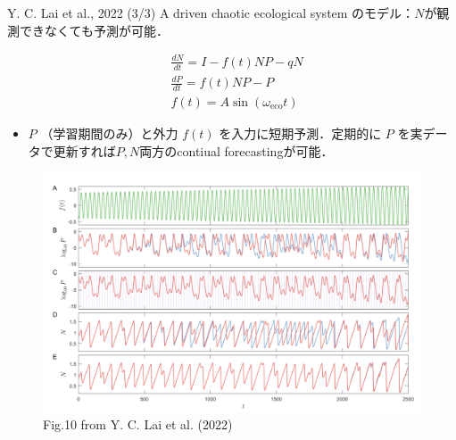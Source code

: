 \begin{frame}{Y. C. Lai et al., 2022 (3/3)}
    A driven chaotic ecological system のモデル：$N$が観測できなくても予測が可能．
    \begin{minipage}{0.35\textwidth}\vspace{-1.0cm}
        \begin{align}
            & \frac{d N}{d t}=I-f(t) N P-q N \\
            & \frac{d P}{d t}=f(t) N P-P\\
            & f(t)=A \sin \left(\omega_{\mathrm{eco}} t\right)
        \end{align}
        \vspace{-.4cm}
        \begin{itemize}
            \item $P$ （学習期間のみ）と外力 $f(t)$ を入力に短期予測．定期的に $P$ を実データで更新すれば$P, N$両方のcontiual forecastingが可能．
        \end{itemize}
    \end{minipage}
    \begin{minipage}{0.64\textwidth}
        \begin{figure}
            \includegraphics[width=\textwidth]{Fig/Fig.10_Lai.png}
            \caption*{Fig.10 from Y. C. Lai et al. (2022)}
            \label{Fig.10_Lai.png} %
        \end{figure}
    \end{minipage}
\end{frame}
